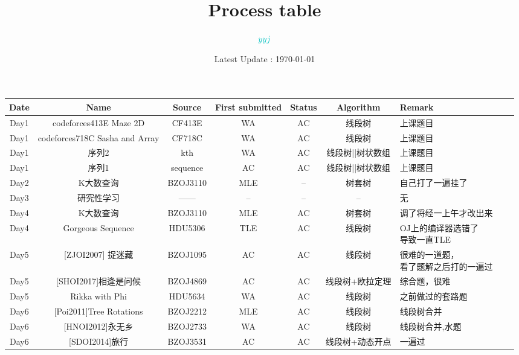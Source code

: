 \documentclass[landscape]{article}
\date{Latest Update : \today}
\title{Process table}
\author{$\textcolor[RGB]{0,192,192}{yyj}$}
\makeatletter
\newcommand{\tabincell}[2]{\begin{tabular}{@{}#1@{}}#2\end{tabular}}
\makeatother
\begin{document}
\maketitle
\color[RGB]{74,74,74}

\begin{longtable}{cccccclll}
  \hline
  Date & Name & Source & First submitted & Status & Algorithm & Remark\\
  \hline
  Day1 & codeforces413E Maze 2D & CF413E & \color{red} WA & \color{green} AC & 线段树 & 上课题目\\
  \hline
  Day1 & codeforces718C Sasha and Array & CF718C & \color{red} WA & \color{green} AC & 线段树 & 上课题目\\
  \hline
  Day1 & 序列2 & kth & \color{red} WA & \color{green} AC & 线段树||树状数组 & 上课题目\\
  \hline
  Day1 & 序列1 & sequence & \color{green} AC & \color{green} AC & 线段树||树状数组 & 上课题目\\
  \hline
  Day2 & K大数查询 & BZOJ3110 & \color{blue} MLE & -- & 树套树 & 自己打了一遍挂了\\
  \hline
  Day3 & 研究性学习 & ------ & -- & -- & -- & 无\\
  \hline
  Day4 & K大数查询 & BZOJ3110 & \color{blue} MLE & \color{green} AC & 树套树 & 调了将经一上午才改出来\\
  \hline
  Day4 & Gorgeous Sequence & HDU5306 & \color{blue} TLE & \color{green} AC  & 线段树 & \tabincell{l}{OJ上的编译器选错了\\导致一直TLE}\\
  \hline
  Day5 & [ZJOI2007] 捉迷藏 & BZOJ1095 & \color{green} AC & \color{green} AC & 线段树 &\tabincell{l}{很难的一道题，\\看了题解之后打的一遍过}\\
  \hline
  Day5 & [SHOI2017]相逢是问候 & BZOJ4869 & \color{green} AC & \color{green} AC & 线段树+欧拉定理 & 综合题，很难\\
  \hline
  Day5 & Rikka with Phi & HDU5634 & \color{red} WA & \color{green} AC & 线段树 &之前做过的套路题\\
  \hline
  Day6 & [Poi2011]Tree Rotations & BZOJ2212 & \color{blue} MLE & \color{green} AC & 线段树 &线段树合并\\
  \hline
  Day6 & [HNOI2012]永无乡 & BZOJ2733 & \color{red} WA & \color{green} AC & 线段树 & 线段树合并,水题\\
  \hline
  Day6 & [SDOI2014]旅行 & BZOJ3531 & \color{green} AC & \color{green} AC & 线段树+动态开点 & 一遍过\\

\end{longtable}
\end{document}
